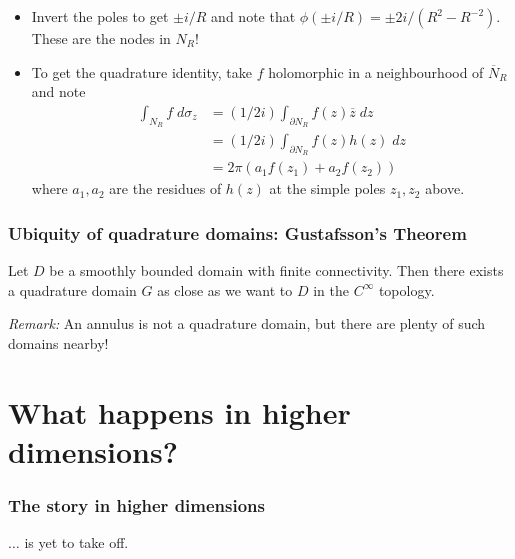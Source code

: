 \documentclass{beamer}
\begin{document}
\begin{frame}

\begin{itemize}

 \item Invert the poles to get $\pm i/R$ and note that $\phi(\pm i/R) = \pm 2i/(R^2 - R^{-2})$. These are the nodes in $N_R$!

 \item To get the quadrature identity, take $f$ holomorphic in a neighbourhood of $\overline N_R$ and note
\begin{align*}
\int_{N_R} f \; d \sigma_z &= (1/2i) \int_{\partial N_R} f(z) \overline z \;dz\\
                         &= (1/2i) \int_{\partial N_R} f(z) h(z) \;dz\\ 
                         &= 2\pi (a_1 f(z_1) + a_2f(z_2))  
\end{align*}
where $a_1, a_2$ are the residues of $h(z)$ at the simple poles $z_1, z_2$ above.

\end{itemize}

\end{frame}


\begin{frame}
 \frametitle{Ubiquity of quadrature domains: Gustafsson's Theorem}

\begin{theorem}
Let $D$ be a smoothly bounded domain with finite connectivity. Then there exists a quadrature domain $G$ as close as we want to $D$ in the $C^{\infty}$ topology.
\end{theorem}

{\it Remark:} An annulus is not a quadrature domain, but there are plenty of such domains nearby!

\end{frame}


\section{What happens in higher dimensions?}

\begin{frame}
 \frametitle{The story in higher dimensions}
\begin{center}
$\ldots$ is yet to take off.
\end{center}
\end{frame}
\end{document}
